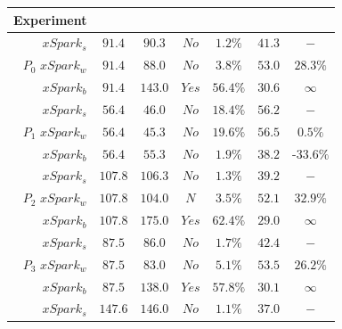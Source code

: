 \begin{table}[tbhp]
	\centering
	\begin{tabular}{r|c|c|c|c|c|c}
		\multicolumn{1}{c|}{\textbf{Experiment}}   &
		\rotatebox{90}{\boldmath$deadline\,[s]$}  &  \rotatebox{90}{\boldmath$exec\_time\,[s]$}  & \rotatebox{90}{\boldmath$violation$} &  \rotatebox{90}{\boldmath$error$}    & \rotatebox{90}{\boldmath$core\_alloc\,[\frac{core}{s}]$}  & \rotatebox{90}{\boldmath$penalty$}   \\
		\midrule
		$xSpark_s$  & $91.4$   & $90.3$   & $No$   & $1.2\%$   & $41.3$   & $-$  \\
		$P_0 \,\,xSpark_w$  & $91.4$   & $88.0$   & $No$   & $3.8\%$   & $53.0$   & $28.3\%$  \\
		$xSpark_b$  & $91.4$   & $143.0$   & $Yes$   & $56.4\%$   & $30.6$   & $\infty$  \\
		\midrule
		$xSpark_s$  & $56.4$   & $46.0$   & $No$   & $18.4\%$   & $56.2$   & $-$  \\
		$P_1 \,\,xSpark_w$  & $56.4$   & $45.3$   & $No$   & $19.6\%$   & $56.5$   & $0.5\%$  \\
		$xSpark_b$  & $56.4$   & $55.3$   & $No$   & $1.9\%$   & $38.2$   & $\text{-}33.6\%$  \\
		\midrule
		$xSpark_s$  & $107.8$   & $106.3$   & $No$   & $1.3\%$   & $39.2$   & $-$  \\
		$P_2 \,\,xSpark_w$  & $107.8$   & $104.0$   & $N$   & $3.5\%$   & $52.1$   & $32.9\%$  \\
		$xSpark_b$  & $107.8$   & $175.0$   & $Yes$   & $62.4\%$   & $29.0$   & $\infty$  \\
		\midrule
		$xSpark_s$  & $87.5$   & $86.0$   & $No$   & $1.7\%$   & $42.4$   & $-$  \\
		$P_3 \,\,xSpark_w$  & $87.5$   & $83.0$   & $No$   & $5.1\%$   & $53.5$   & $26.2\%$  \\
		$xSpark_b$  & $87.5$   & $138.0$   & $Yes$   & $57.8\%$   & $30.1$   & $\infty$  \\
		\midrule
		$xSpark_s$  & $147.6$   & $146.0$   & $No$   & $1.1\%$   & $37.0$   & $-$  \\

\end{tabular}
\end{table}
